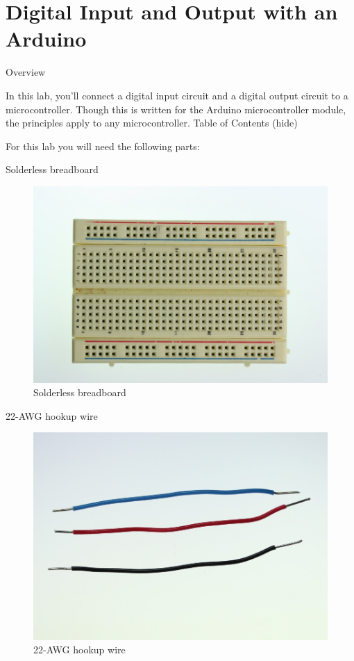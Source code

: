 \chapter{Digital Input and Output with an Arduino}

Overview

In this lab, you'll connect a digital input circuit and a digital output circuit to a microcontroller. Though this is written for the Arduino microcontroller module, the principles apply to any microcontroller.
Table of Contents (hide)

For this lab you will need the following parts:

Solderless breadboard

\begin{figure}[!htb]
 \centering
 \includegraphics[scale=0.3]{img/digitalio/breadboard.jpg}
 \caption{Solderless breadboard}
 \label{Solderless breadboard}
\end{figure}

22-AWG hookup wire

\begin{figure}[!htb]
 \centering
 \includegraphics[scale=0.3]{img/digitalio/hookup_wire.jpg}
 \caption{22-AWG hookup wire}
 \label{22-AWG hookup wire}
\end{figure}

